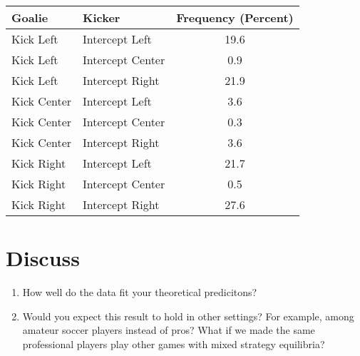\documentclass[12pt]{exam}
\begin{document}
  \begin{center}
    \begin{tabular}{|l|l|c|}
      \textbf{Goalie} & \textbf{Kicker} & \textbf{Frequency (Percent)} \\ \hline \hline
      Kick Left   & Intercept Left   & 19.6  \\ \hline
      Kick Left   & Intercept Center & 0.9  \\ \hline
      Kick Left   & Intercept Right  & 21.9  \\ \hline
      Kick Center & Intercept Left   & 3.6  \\ \hline
      Kick Center & Intercept Center & 0.3  \\ \hline
      Kick Center & Intercept Right  & 3.6  \\ \hline
      Kick Right  & Intercept Left   & 21.7  \\ \hline
      Kick Right  & Intercept Center & 0.5  \\ \hline
      Kick Right  & Intercept Right  & 27.6  \\ \hline
    \end{tabular}
  \end{center}

\section*{Discuss}

\begin{enumerate}
  
  \item How well do the data fit your theoretical predicitons?

  \item Would you expect this result to hold in other settings? 
  For example, among amateur soccer players instead of pros? 
  What if we made the same professional players play other games 
  with mixed strategy equilibria?

\end{enumerate}
\end{document}
